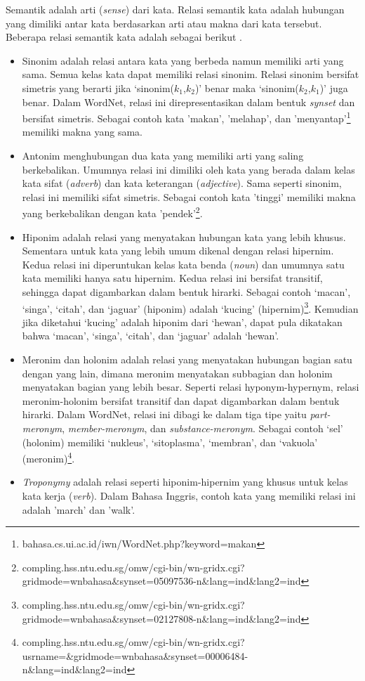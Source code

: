Semantik adalah arti (\textit{sense}) dari kata. Relasi semantik kata adalah hubungan yang dimiliki antar kata berdasarkan arti atau makna dari kata tersebut. Beberapa relasi semantik kata adalah sebagai berikut \citep{miller1995wordnet}.
\begin{itemize}
  \item Sinonim adalah relasi antara kata yang berbeda namun memiliki arti yang sama. Semua kelas kata dapat memiliki relasi sinonim. Relasi sinonim bersifat simetris yang berarti jika `sinonim($k_1$,$k_2$)' benar maka `sinonim($k_2$,$k_1$)' juga benar. Dalam WordNet, relasi ini direpresentasikan dalam bentuk \textit{synset} dan bersifat simetris. Sebagai contoh kata 'makan', 'melahap', dan 'menyantap'\footnote{bahasa.cs.ui.ac.id/iwn/WordNet.php?keyword=makan} memiliki makna yang sama.
  \item Antonim menghubungan dua kata yang memiliki arti yang saling berkebalikan. Umumnya relasi ini dimiliki oleh kata yang berada dalam kelas kata sifat (\textit{adverb}) dan kata keterangan (\textit{adjective}). Sama seperti sinonim, relasi ini memiliki sifat simetris. Sebagai contoh kata 'tinggi' memiliki makna yang berkebalikan dengan kata 'pendek'\footnote{compling.hss.ntu.edu.sg/omw/cgi-bin/wn-gridx.cgi?gridmode=wnbahasa\&synset=05097536-n\&lang=ind\&lang2=ind}.
  \item Hiponim adalah relasi yang menyatakan hubungan kata yang lebih khusus. Sementara untuk kata yang lebih umum dikenal dengan relasi hipernim. Kedua relasi ini diperuntukan kelas kata benda (\textit{noun}) dan umumnya satu kata memiliki hanya satu hipernim. Kedua relasi ini bersifat transitif, sehingga dapat digambarkan dalam bentuk hirarki. Sebagai contoh `macan', `singa', `citah', dan `jaguar' (hiponim) adalah `kucing' (hipernim)\footnote{compling.hss.ntu.edu.sg/omw/cgi-bin/wn-gridx.cgi?gridmode=wnbahasa\&synset=02127808-n\&lang=ind\&lang2=ind}. Kemudian jika diketahui `kucing' adalah hiponim dari `hewan', dapat pula dikatakan bahwa `macan', `singa', `citah', dan `jaguar' adalah `hewan'.
  \item Meronim dan holonim adalah relasi yang menyatakan hubungan bagian satu dengan yang lain, dimana meronim menyatakan subbagian dan holonim menyatakan bagian yang lebih besar. Seperti relasi hyponym-hypernym, relasi meronim-holonim bersifat transitif dan dapat digambarkan dalam bentuk hirarki. Dalam WordNet, relasi ini dibagi ke dalam tiga tipe yaitu \textit{part-meronym}, \textit{member-meronym}, dan \textit{substance-meronym}. Sebagai contoh `sel' (holonim) memiliki `nukleus', `sitoplasma', `membran', dan `vakuola' (meronim)\footnote{compling.hss.ntu.edu.sg/omw/cgi-bin/wn-gridx.cgi?usrname=\&gridmode=wnbahasa\&synset=00006484-n\&lang=ind\&lang2=ind}. 
  \item \textit{Troponymy} adalah relasi seperti hiponim-hipernim yang khusus untuk kelas kata kerja (\textit{verb}). Dalam Bahasa Inggris, contoh kata yang memiliki relasi ini adalah 'march' dan 'walk'.
\end{itemize}

